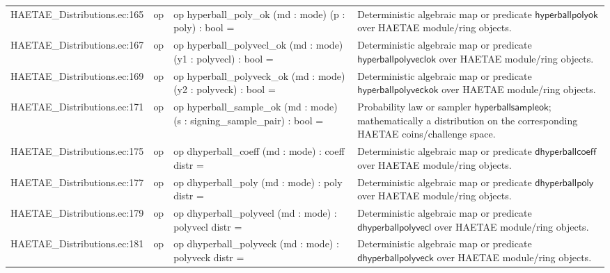\documentclass[10pt]{article}
\begin{document}
\begin{longtable}{L{0.11\textwidth}L{0.055\textwidth}L{0.385\textwidth}L{0.41\textwidth}}
HAETAE\_\allowbreak{}Distributions.\allowbreak{}ec:\allowbreak{}165 & op & {\ttfamily\scriptsize op hyperball\_\allowbreak{}poly\_\allowbreak{}ok (md : mode) (p : poly) : bool =} & Deterministic algebraic map or predicate $\mathsf{hyperballpolyok}$ over HAETAE module/ring objects. \\
HAETAE\_\allowbreak{}Distributions.\allowbreak{}ec:\allowbreak{}167 & op & {\ttfamily\scriptsize op hyperball\_\allowbreak{}polyvecl\_\allowbreak{}ok (md : mode) (y1 : polyvecl) : bool =} & Deterministic algebraic map or predicate $\mathsf{hyperballpolyveclok}$ over HAETAE module/ring objects. \\
HAETAE\_\allowbreak{}Distributions.\allowbreak{}ec:\allowbreak{}169 & op & {\ttfamily\scriptsize op hyperball\_\allowbreak{}polyveck\_\allowbreak{}ok (md : mode) (y2 : polyveck) : bool =} & Deterministic algebraic map or predicate $\mathsf{hyperballpolyveckok}$ over HAETAE module/ring objects. \\
HAETAE\_\allowbreak{}Distributions.\allowbreak{}ec:\allowbreak{}171 & op & {\ttfamily\scriptsize op hyperball\_\allowbreak{}sample\_\allowbreak{}ok (md : mode) (s : signing\_\allowbreak{}sample\_\allowbreak{}pair) : bool =} & Probability law or sampler $\mathsf{hyperballsampleok}$; mathematically a distribution on the corresponding HAETAE coins/challenge space. \\
HAETAE\_\allowbreak{}Distributions.\allowbreak{}ec:\allowbreak{}175 & op & {\ttfamily\scriptsize op dhyperball\_\allowbreak{}coeff (md : mode) : coeff distr =} & Deterministic algebraic map or predicate $\mathsf{dhyperballcoeff}$ over HAETAE module/ring objects. \\
HAETAE\_\allowbreak{}Distributions.\allowbreak{}ec:\allowbreak{}177 & op & {\ttfamily\scriptsize op dhyperball\_\allowbreak{}poly (md : mode) : poly distr =} & Deterministic algebraic map or predicate $\mathsf{dhyperballpoly}$ over HAETAE module/ring objects. \\
HAETAE\_\allowbreak{}Distributions.\allowbreak{}ec:\allowbreak{}179 & op & {\ttfamily\scriptsize op dhyperball\_\allowbreak{}polyvecl (md : mode) : polyvecl distr =} & Deterministic algebraic map or predicate $\mathsf{dhyperballpolyvecl}$ over HAETAE module/ring objects. \\
HAETAE\_\allowbreak{}Distributions.\allowbreak{}ec:\allowbreak{}181 & op & {\ttfamily\scriptsize op dhyperball\_\allowbreak{}polyveck (md : mode) : polyveck distr =} & Deterministic algebraic map or predicate $\mathsf{dhyperballpolyveck}$ over HAETAE module/ring objects. \\

\end{longtable}
\end{document}
